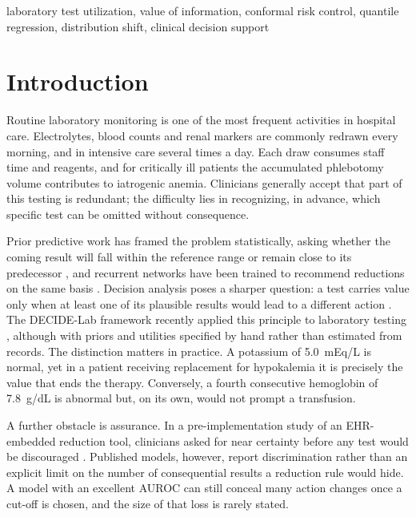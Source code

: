 \documentclass[conference]{IEEEtran}
\begin{document}
\begin{IEEEkeywords}
laboratory test utilization, value of information, conformal risk control, quantile regression, distribution shift, clinical decision support
\end{IEEEkeywords}

\section{Introduction}
Routine laboratory monitoring is one of the most frequent activities in hospital care. Electrolytes, blood counts and renal markers are commonly redrawn every morning, and in intensive care several times a day. Each draw consumes staff time and reagents, and for critically ill patients the accumulated phlebotomy volume contributes to iatrogenic anemia. Clinicians generally accept that part of this testing is redundant; the difficulty lies in recognizing, in advance, which specific test can be omitted without consequence.

Prior predictive work has framed the problem statistically, asking whether the coming result will fall within the reference range \cite{xu2019lowyield} or remain close to its predecessor \cite{aikens2023yield}, and recurrent networks have been trained to recommend reductions on the same basis \cite{yu2020deep,li2022external,huang2023confidence}. Decision analysis poses a sharper question: a test carries value only when at least one of its plausible results would lead to a different action \cite{howard1966,pauker1980}. The DECIDE-Lab framework recently applied this principle to laboratory testing \cite{allenbrand2026decidelab}, although with priors and utilities specified by hand rather than estimated from records. The distinction matters in practice. A potassium of 5.0~mEq/L is normal, yet in a patient receiving replacement for hypokalemia it is precisely the value that ends the therapy. Conversely, a fourth consecutive hemoglobin of 7.8~g/dL is abnormal but, on its own, would not prompt a transfusion.

A further obstacle is assurance. In a pre-implementation study of an EHR-embedded reduction tool, clinicians asked for near certainty before any test would be discouraged \cite{rabbani2023targeting}. Published models, however, report discrimination rather than an explicit limit on the number of consequential results a reduction rule would hide. A model with an excellent AUROC can still conceal many action changes once a cut-off is chosen, and the size of that loss is rarely stated.
\end{document}
